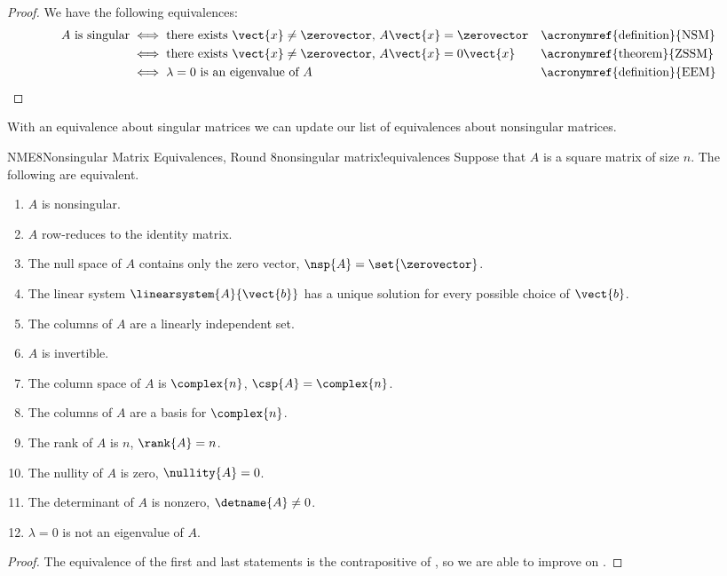 %
\begin{proof}
We have the following equivalences:
%
\begin{align*}
\text{$A$ is singular}&\iff\text{there exists $\vect{x}\neq\zerovector$, $A\vect{x}=\zerovector$}&&\text{\acronymref{definition}{NSM}}\\
&\iff\text{there exists $\vect{x}\neq\zerovector$, $A\vect{x}=0\vect{x}$}&&\text{\acronymref{theorem}{ZSSM}}\\
&\iff\text{$\lambda=0$ is an eigenvalue of $A$}&&\text{\acronymref{definition}{EEM}}
%
\end{align*}
%
\end{proof}
%
With an equivalence about singular matrices we can update our list of equivalences about nonsingular matrices.
%
\begin{theorem}{NME8}{Nonsingular Matrix Equivalences, Round 8}{nonsingular matrix!equivalences}
Suppose that $A$ is a square matrix of size $n$.  The following are equivalent.
%
\begin{enumerate}
\item $A$ is nonsingular.
\item $A$ row-reduces to the identity matrix.
\item The null space of $A$ contains only the zero vector, $\nsp{A}=\set{\zerovector}$.
\item The linear system $\linearsystem{A}{\vect{b}}$ has a unique solution for every possible choice of $\vect{b}$.
\item The columns of $A$ are a linearly independent set.
\item $A$ is invertible.
\item The column space of $A$ is $\complex{n}$, $\csp{A}=\complex{n}$.
\item The columns of $A$ are a basis for $\complex{n}$.
\item The rank of $A$ is $n$, $\rank{A}=n$.
\item The nullity of $A$ is zero, $\nullity{A}=0$.
\item The determinant of $A$ is nonzero, $\detname{A}\neq 0$.
\item $\lambda=0$ is not an eigenvalue of $A$.
\end{enumerate}
\end{theorem}
%
\begin{proof}
The equivalence of the first and last statements is the contrapositive of , so we are able to improve on .
\end{proof}
